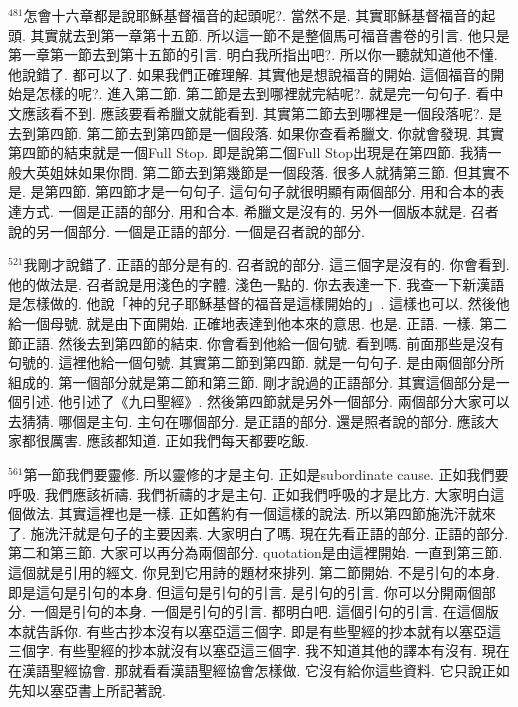 \documentclass{book}
\begin{document}
$^{481}$怎會十六章都是說耶穌基督福音的起頭呢?.
當然不是.
其實耶穌基督福音的起頭.
其實就去到第一章第十五節.
所以這一節不是整個馬可福音書卷的引言.
他只是第一章第一節去到第十五節的引言.
明白我所指出吧?.
所以你一聽就知道他不懂.
他說錯了.
都可以了.
如果我們正確理解.
其實他是想說福音的開始.
這個福音的開始是怎樣的呢?.
進入第二節.
第二節是去到哪裡就完結呢?.
就是完一句句子.
看中文應該看不到.
應該要看希臘文就能看到.
其實第二節去到哪裡是一個段落呢?.
是去到第四節.
第二節去到第四節是一個段落.
如果你查看希臘文.
你就會發現.
其實第四節的結束就是一個Full Stop.
即是說第二個Full Stop出現是在第四節.
我猜一般大英姐妹如果你問.
第二節去到第幾節是一個段落.
很多人就猜第三節.
但其實不是.
是第四節.
第四節才是一句句子.
這句句子就很明顯有兩個部分.
用和合本的表達方式.
一個是正語的部分.
用和合本.
希臘文是沒有的.
另外一個版本就是.
召者說的另一個部分.
一個是正語的部分.
一個是召者說的部分.

$^{521}$我剛才說錯了.
正語的部分是有的.
召者說的部分.
這三個字是沒有的.
你會看到.
他的做法是.
召者說是用淺色的字體.
淺色一點的.
你去表達一下.
我查一下新漢語是怎樣做的.
他說「神的兒子耶穌基督的福音是這樣開始的」.
這樣也可以.
然後他給一個母號.
就是由下面開始.
正確地表達到他本來的意思.
也是.
正語.
一樣.
第二節正語.
然後去到第四節的結束.
你會看到他給一個句號.
看到嗎.
前面那些是沒有句號的.
這裡他給一個句號.
其實第二節到第四節.
就是一句句子.
是由兩個部分所組成的.
第一個部分就是第二節和第三節.
剛才說過的正語部分.
其實這個部分是一個引述.
他引述了《九曰聖經》.
然後第四節就是另外一個部分.
兩個部分大家可以去猜猜.
哪個是主句.
主句在哪個部分.
是正語的部分.
還是照者說的部分.
應該大家都很厲害.
應該都知道.
正如我們每天都要吃飯.

$^{561}$第一節我們要靈修.
所以靈修的才是主句.
正如是subordinate cause.
正如我們要呼吸.
我們應該祈禱.
我們祈禱的才是主句.
正如我們呼吸的才是比方.
大家明白這個做法.
其實這裡也是一樣.
正如舊約有一個這樣的說法.
所以第四節施洗汗就來了.
施洗汗就是句子的主要因素.
大家明白了嗎.
現在先看正語的部分.
正語的部分.
第二和第三節.
大家可以再分為兩個部分.
quotation是由這裡開始.
一直到第三節.
這個就是引用的經文.
你見到它用詩的題材來排列.
第二節開始.
不是引句的本身.
即是這句是引句的本身.
但這句是引句的引言.
是引句的引言.
你可以分開兩個部分.
一個是引句的本身.
一個是引句的引言.
都明白吧.
這個引句的引言.
在這個版本就告訴你.
有些古抄本沒有以塞亞這三個字.
即是有些聖經的抄本就有以塞亞這三個字.
有些聖經的抄本就沒有以塞亞這三個字.
我不知道其他的譯本有沒有.
現在在漢語聖經協會.
那就看看漢語聖經協會怎樣做.
它沒有給你這些資料.
它只說正如先知以塞亞書上所記著說.
\end{document}
